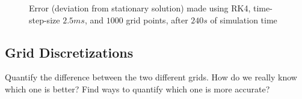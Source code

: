 \begin{figure}[!h]
    \caption{Error (deviation from stationary solution) made using RK4, time-step-size $2.5ms$, and $1000$ grid points, after $240s$ of simulation time}
    \label{fig:lorenz_stat_err}
\end{figure}



\subsection{Grid Discretizations}%
Quantify the difference between the two different grids.
How do we really know which one is better?
Find ways to quantify which one is more accurate?